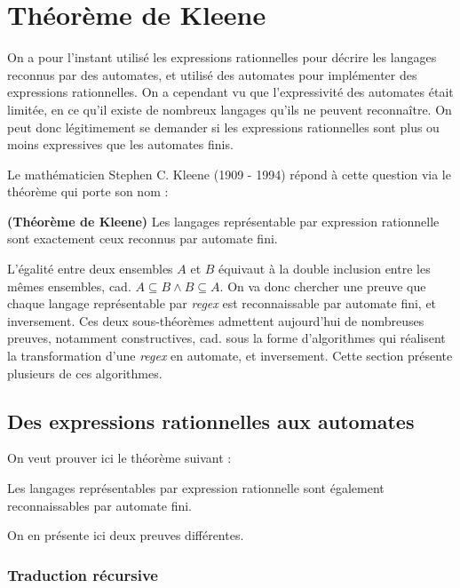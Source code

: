 \chapter{Théorème de Kleene}
\label{hierarchie}

On a pour l'instant utilisé les expressions rationnelles pour décrire les langages reconnus par des automates, et utilisé des automates pour implémenter des expressions rationnelles. On a cependant vu que l'expressivité des automates était limitée, en ce qu'il existe de nombreux langages qu'ils ne peuvent reconnaître. On peut donc légitimement se demander si les expressions rationnelles sont plus ou moins expressives que les automates finis.

Le mathématicien Stephen C. Kleene (1909 - 1994) répond à cette question via le théorème qui porte son nom :

\begin{theorem}{\textbf{(Théorème de Kleene)}}
Les langages représentable par expression rationnelle sont exactement ceux reconnus par automate fini.
\end{theorem}

L'égalité entre deux ensembles $A$ et $B$ équivaut à la double inclusion entre les mêmes ensembles, cad. $A \subseteq B \wedge B \subseteq A$. On va donc chercher une preuve que chaque langage représentable par \textit{regex} est reconnaissable par automate fini, et inversement. Ces deux sous-théorèmes admettent aujourd'hui de nombreuses preuves, notamment constructives, cad. sous la forme d'algorithmes qui réalisent la transformation d'une \textit{regex} en automate, et inversement. Cette section présente plusieurs de ces algorithmes.

\section{Des expressions rationnelles aux automates}

On veut prouver ici le théorème suivant :

\begin{theorem}
Les langages représentables par expression rationnelle sont également reconnaissables par automate fini.
\end{theorem}

On en présente ici deux preuves différentes.

\subsection{Traduction récursive}

